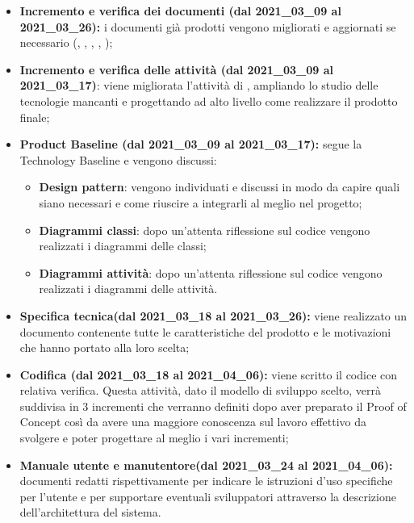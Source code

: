 \begin{itemize}
    \item \textbf{Incremento e verifica dei documenti (dal 2021\_03\_09 al 2021\_03\_26):} i documenti già prodotti vengono migliorati e aggiornati se necessario ({\NdP}, {\PdP}, {\Glossario}, {\PdQ}, {\AdR});
    \item \textbf{Incremento e verifica delle attività (dal 2021\_03\_09 al 2021\_03\_17)}: viene migliorata l'attività di , ampliando lo studio delle tecnologie mancanti e progettando ad alto livello come realizzare il prodotto finale;
    \item \textbf{Product Baseline (dal 2021\_03\_09 al 2021\_03\_17):} segue la Technology Baseline e vengono discussi:
        \begin{itemize}
            \item \textbf{Design pattern}: vengono individuati e discussi in modo da capire quali siano necessari e come riuscire a integrarli al meglio nel progetto;
            \item \textbf{Diagrammi classi}: dopo un'attenta riflessione sul codice vengono realizzati i diagrammi delle classi;
            \item \textbf{Diagrammi attività}: dopo un'attenta riflessione sul codice vengono realizzati i diagrammi delle attività. 
        \end{itemize} 
    \item \textbf{Specifica tecnica(dal 2021\_03\_18 al 2021\_03\_26):} viene realizzato un documento contenente tutte le caratteristiche del prodotto e le motivazioni che hanno portato alla loro scelta;
    \item \textbf{Codifica (dal 2021\_03\_18 al 2021\_04\_06):} viene scritto il codice con relativa verifica. Questa attività, dato il modello di sviluppo scelto, verrà suddivisa in 3 incrementi che verranno definiti dopo aver preparato il Proof of Concept così da avere una maggiore conoscenza sul lavoro effettivo da svolgere e poter progettare al meglio i vari incrementi;
    \item \textbf{Manuale utente e manutentore(dal 2021\_03\_24 al 2021\_04\_06):} documenti redatti rispettivamente per indicare le istruzioni d'uso specifiche per l'utente e per supportare eventuali sviluppatori attraverso la descrizione dell'architettura del sistema.
\end{itemize}
